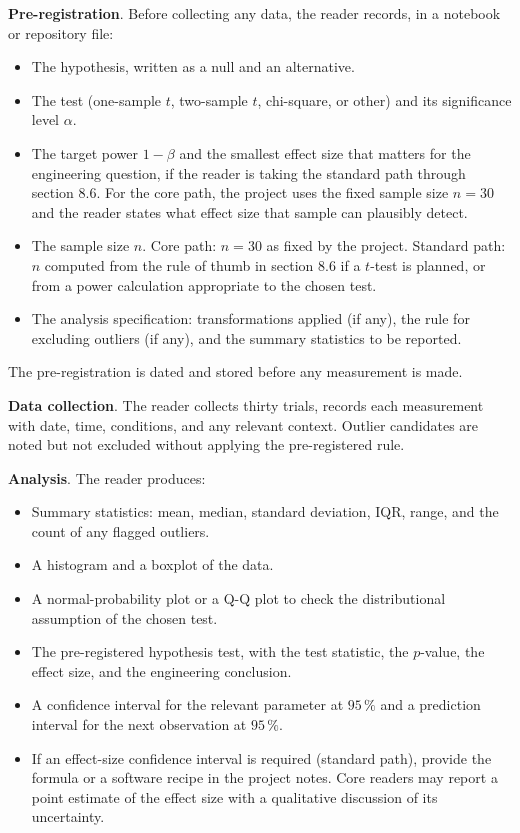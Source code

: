 \begin{project}
\textbf{Pre-registration}. Before collecting any data, the reader
records, in a notebook or repository file:

\begin{itemize}[leftmargin=*]
  \item The hypothesis, written as a null and an alternative.
  \item The test (one-sample $t$, two-sample $t$, chi-square, or
    other) and its significance level $\alpha$.
  \item The target power $1 - \beta$ and the smallest effect size
    that matters for the engineering question, if the reader is
    taking the standard path through section 8.6. For the core
    path, the project uses the fixed sample size $n = 30$ and the
    reader states what effect size that sample can plausibly detect.
  \item The sample size $n$. Core path: $n = 30$ as fixed by the
    project. Standard path: $n$ computed from the rule of thumb in
    section 8.6 if a $t$-test is planned, or from a power
    calculation appropriate to the chosen test.
  \item The analysis specification: transformations applied (if
    any), the rule for excluding outliers (if any), and the
    summary statistics to be reported.
\end{itemize}

The pre-registration is dated and stored before any measurement is
made.

\textbf{Data collection}. The reader collects thirty trials,
records each measurement with date, time, conditions, and any
relevant context. Outlier candidates are noted but not excluded
without applying the pre-registered rule.

\textbf{Analysis}. The reader produces:

\begin{itemize}[leftmargin=*]
  \item Summary statistics: mean, median, standard deviation, IQR,
    range, and the count of any flagged outliers.
  \item A histogram and a boxplot of the data.
  \item A normal-probability plot or a Q-Q plot to check the
    distributional assumption of the chosen test.
  \item The pre-registered hypothesis test, with the test statistic,
    the $p$-value, the effect size, and the engineering conclusion.
  \item A confidence interval for the relevant parameter at
    $95 \,\%$ and a prediction interval for the next observation
    at $95 \,\%$.
  \item If an effect-size confidence interval is required (standard
    path), provide the formula or a software recipe in the project
    notes. Core readers may report a point estimate of the effect
    size with a qualitative discussion of its uncertainty.
\end{itemize}


\end{project}
